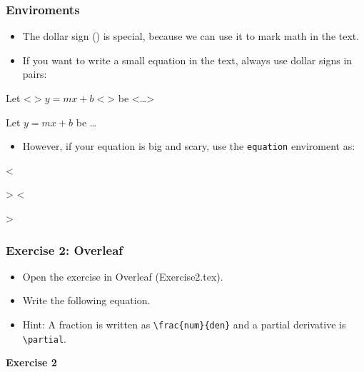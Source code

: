 \documentclass{beamer}
\def\openesc{\color{blue}}
\def\closeesc{\color{black}}
\def\vbdelim{\catcode`<=\active\catcode`>=\active%
\def<{\openesc}
\def>{\closeesc}}
\begin{document}
\begin{frame}[fragile]
\frametitle{Enviroments}
\begin{itemize}
\item The dollar sign (\color{red}{\$}\color{black}{}) is special, because we can use it to mark math in the text.\\
\item If you want to write a small equation in the text, always use dollar signs in pairs:
\end{itemize}
\begin{framed}
\begin{minipage}[b]{.4\textwidth}
\begin{verbnobox}[\vbdelim]
Let <$>y=mx+b<$> be <\ldots>
\end{verbnobox}
\end{minipage}%
\end{framed}
\begin{framed}
\begin{minipage}[b]{.4\textwidth}
Let $y=mx+b$ be \ldots
\end{minipage}
\end{framed}
\begin{itemize}
\item However, if your equation is big and scary, use the \verb|equation| enviroment as: 
\end{itemize}

\begin{verbnobox}[\vbdelim]
<\begin{>equation<}>
<\end{>equation<}>
\end{verbnobox}
\end{frame}

\begin{frame}[fragile]
\frametitle{Exercise 2: Overleaf}
\begin{itemize}
\item Open the exercise in Overleaf (Exercise2.tex).
\item Write the following equation.
\item  Hint: A fraction is written as \verb|\frac{num}{den}| and a partial derivative is \verb|\partial|.
\end{itemize}

\textbf{Exercise 2}
\noindent{}
\end{frame}
\end{document}
